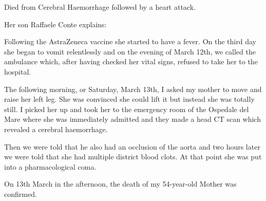 Died from Cerebral Haemorrhage followed by a heart attack.

Her son Raffaele Conte explains:

Following the AstraZeneca vaccine she started to have a fever. On the third day
she began to vomit relentlessly and on the evening of March 12th, we called the
ambulance which, after having checked her vital signs, refused to take her to
the hospital.

The following morning, or Saturday, March 13th, I asked my mother to move and
raise her left leg. She was convinced she could lift it but instead she was
totally still. I picked her up and took her to the emergency room of the
Ospedale del Mare where she was immediately admitted and they made a head CT
scan which revealed a cerebral haemorrhage.

Then we were told that he also had an occlusion of the aorta and two hours later
we were told that she had multiple district blood clots. At that point she was
put into a pharmacological coma.

On 13th March in the afternoon, the death of my 54-year-old Mother was
confirmed.

